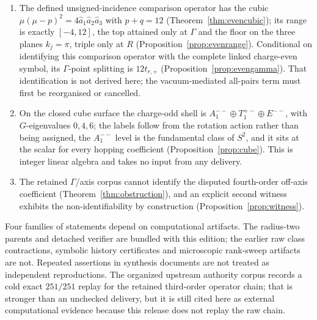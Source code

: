 \documentclass[11pt]{article}
\theoremstyle{plain}
\theoremstyle{definition}
\theoremstyle{remark}
\begin{document}
\begin{enumerate}
  \eqref{eq:w} and needs no input beyond Theorem~\ref{thm:weingarten}.
\item The defined unsigned-incidence comparison operator has the cubic
  $\mu(\mu-p)^2=4\hat a_1\hat a_2\hat a_3$ with $p+q=12$
  (Theorem~\ref{thm:evencubic}); its range is exactly $[-4,12]$, the top
  attained only at $\Gamma$ and the floor on the three planes $k_j=\pi$, triple
  only at $R$ (Proposition~\ref{prop:evenrange}). Conditional on identifying
  this comparison operator with the complete linked charge-even symbol, its
  $\Gamma$-point splitting is $12t_{r,+}$
  (Proposition~\ref{prop:evengamma}). That identification is not derived here;
  the vacuum-mediated all-pairs term must first be reorganised or cancelled.
\item On the closed cube surface the charge-odd shell is
  $A_1^{--}\oplus T_1^{+-}\oplus E^{--}$, with $G$-eigenvalues $0,4,6$; the
  labels follow from the rotation action rather than being assigned, the
  $A_1^{--}$ level is the fundamental class of $S^2$, and it sits at the scalar
  for every hopping coefficient (Proposition~\ref{prop:cube}). This is integer
  linear algebra and takes no input from any delivery.
\item The retained $\Gamma$/axis corpus cannot identify the disputed
  fourth-order off-axis coefficient (Theorem~\ref{thm:obstruction}), and an
  explicit second witness exhibits the non-identifiability by construction
  (Proposition~\ref{prop:witness}).
\end{enumerate}

Four families of statements depend on computational artifacts. The
radius-two parents and detached verifier are bundled with this edition; the
earlier raw class contractions, symbolic history certificates and microscopic
rank-sweep artifacts are not. Repeated assertions in synthesis documents are
not treated as independent reproductions. The organized upstream authority
corpus records a cold exact $251/251$ replay for the retained third-order
operator chain; that is stronger than an unchecked delivery, but it is still
cited here as external computational evidence because this release does not
replay the raw chain.
\end{document}

